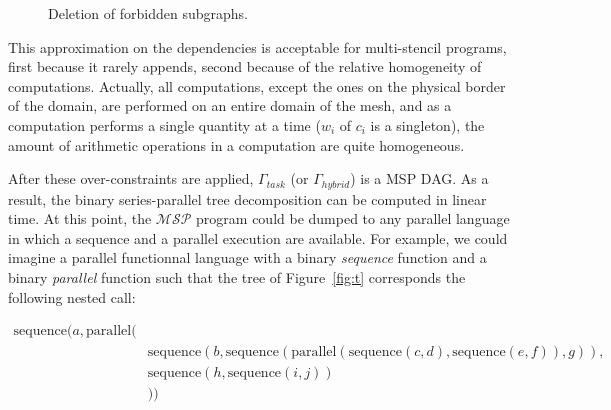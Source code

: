 \begin{figure}[h!]
\begin{center}
\hspace{50pt}
\caption{Deletion of forbidden subgraphs.}
\label{fig:allover}
\end{center}
\end{figure}

This approximation on the dependencies is acceptable for multi-stencil programs, first because it rarely appends, second because of the relative homogeneity of computations. Actually, all computations, except the ones on the physical border of the domain, are performed on an entire domain of the mesh, and as a computation performs a single quantity at a time ($w_i$ of $c_i$ is a singleton), the amount of arithmetic operations in a computation are quite homogeneous.

After these over-constraints are applied, $\Gamma_{task}$ (or $\Gamma_{hybrid}$) is a MSP DAG. As a result, the binary series-parallel tree decomposition can be computed in linear time. At this point, the $\mathcal{MSP}$ program could be dumped to any parallel language in which a sequence and a parallel execution are available. For example, we could imagine a parallel functionnal language with a binary \emph{sequence} function and a binary \emph{parallel} function such that the tree of Figure~\ref{fig:t} corresponds the following nested call:

\begin{equation}
\begin{split}
\text{sequence}(a,\text{parallel}(&\\
&\text{sequence}(b,\text{sequence}(\text{parallel}(\text{sequence}(c,d),\text{sequence}(e,f)),g)),\\
&\text{sequence}(h,\text{sequence}(i,j))\\
&))
\end{split}
\end{equation}